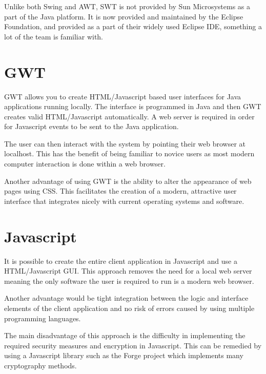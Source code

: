 Unlike both Swing and AWT, SWT is not provided by Sun Microsystems as a part of 
the Java platform. It is now provided and maintained by the Eclipse Foundation, 
and provided as a part of their widely used Eclipse IDE, something a lot of the 
team is familiar with.

\section{GWT}
GWT allows you to create HTML/Javascript based user interfaces for Java 
applications running locally. The interface is programmed in Java and then GWT 
creates valid HTML/Javascript automatically. A web server is required in order
for Javascript events to be sent to the Java application.

The user can then interact with the system by pointing their web browser at 
localhost. This has the benefit of being familiar to novice users as most modern 
computer interaction is done within a web browser. 

Another advantage of using GWT is the ability to alter the appearance of web 
pages using CSS. This facilitates the creation of a modern, attractive user 
interface that integrates nicely with current operating systems and software.

\section{Javascript}
It is possible to create the entire client application in Javascript and use a 
HTML/Javascript GUI. This approach removes the need for a local web server 
meaning the only software the user is required to run is a modern web browser.

Another advantage would be tight integration between the logic and interface 
elements of the client application and no risk of errors caused by using 
multiple programming languages.

The main disadvantage of this approach is the difficulty in implementing the 
required security measures and encryption in Javascript. This can be remedied by 
using a Javascript library such as the Forge project which implements many 
cryptography methods.

\begin{comment}
Starts to get more into client side logic here but I think it is important to 
mention as this method would require an entire rewrite of the client. -Louis-
\end{comment}